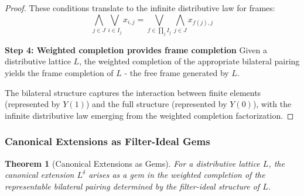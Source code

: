 \documentclass[11pt]{article}
\theoremstyle{plain}
\newtheorem{theorem}{Theorem}[section]
\theoremstyle{definition}
\theoremstyle{remark}
\begin{document}
\begin{proof}
These conditions translate to the infinite distributive law for frames:
$$\bigwedge_{j \in J} \bigvee_{i \in I_j} x_{i,j} = \bigvee_{f \in \prod_j I_j} \bigwedge_{j \in J} x_{f(j),j}$$

\textbf{Step 4: Weighted completion provides frame completion}
Given a distributive lattice $L$, the weighted completion of the appropriate bilateral pairing yields the frame completion of $L$ - the free frame generated by $L$.

The bilateral structure captures the interaction between finite elements (represented by $Y(1)$) and the full structure (represented by $Y(0)$), with the infinite distributive law emerging from the weighted completion factorization.
\end{proof}

\subsubsection{Canonical Extensions as Filter-Ideal Gems}

\begin{theorem}[Canonical Extensions as Gems]\label{thm:canonical-extensions-gems}
For a distributive lattice $L$, the canonical extension $L^{\delta}$ arises as a gem in the weighted completion of the representable bilateral pairing determined by the filter-ideal structure of $L$.
\end{theorem}
\end{document}
